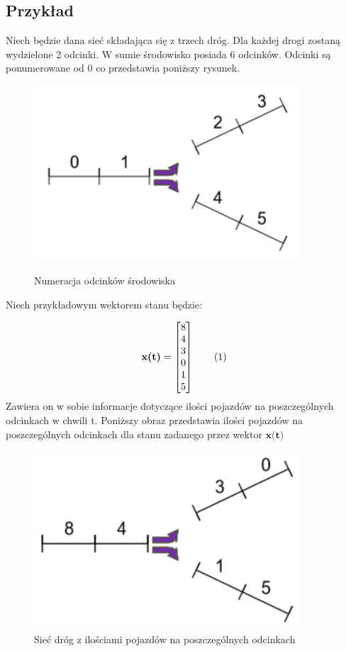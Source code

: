\documentclass[12pt]{book}
\theoremstyle{plain}
\newcommand\addtag{\refstepcounter{equation}
\renewcommand{\labelenumii}{\theenumii}
\renewcommand{\theenumii}{\theenumi.\arabic{enumii}.}
\tag{\theequation}}
\begin{document}
\subsection{Przykład} \label{subsec:wektor_stanu_siec_przyklad}
Niech będzie dana sieć składająca się z trzech dróg. Dla każdej drogi zostaną wydzielone 2 odcinki. W sumie środowisko posiada 6 odcinków. Odcinki są ponumerowane od 0 co przedstawia poniższy rysunek.
	\begin{figure}[H]
	\centering
	\includegraphics[width=10cm]{images/env_11}
	\label{fig:env_11}
	\caption{Numeracja odcinków środowiska}
\end{figure}

Niech przykładowym wektorem stanu będzie:
\def \xzero {\begin{bmatrix}
		8 \\ 4 \\ 3 \\ 0 \\ 1 \\ 5
\end{bmatrix}}

\[\textbf{x(t)}=\xzero \addtag \]
Zawiera on w sobie informacje dotyczące ilości pojazdów na poszczególnych odcinkach w chwili t. Poniższy obraz przedstawia ilości pojazdów na poszczególnych odcinkach dla stanu zadanego przez wektor $\textbf{x(t)}$
\begin{figure}[H]
	\centering
	\includegraphics[width=10cm]{images/env_11_843015}
	\caption{Sieć dróg z ilościami pojazdów na poszczególnych odcinkach}
	\label{fig:3_single_road}
\end{figure}
\end{document}
